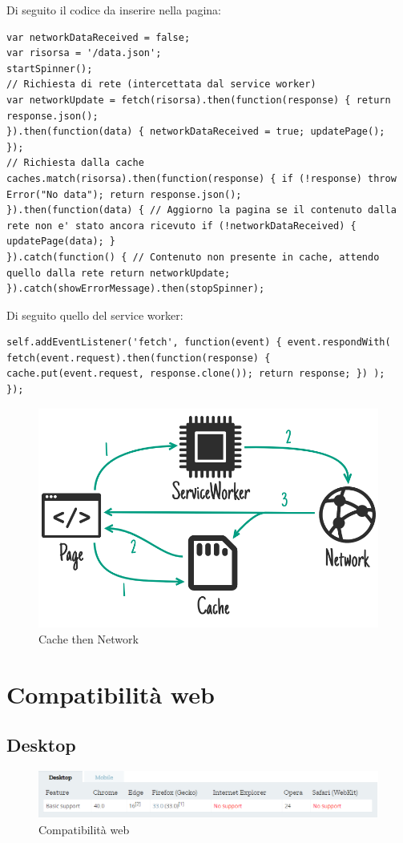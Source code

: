 \documentclass[italian]{article}
\begin{document}
Di seguito il codice da inserire nella pagina:
\begin{lstlisting}
var networkDataReceived = false;
var risorsa = '/data.json';
startSpinner();
// Richiesta di rete (intercettata dal service worker)
var networkUpdate = fetch(risorsa).then(function(response) { return response.json();
}).then(function(data) { networkDataReceived = true; updatePage();
});
// Richiesta dalla cache
caches.match(risorsa).then(function(response) { if (!response) throw Error("No data"); return response.json();
}).then(function(data) { // Aggiorno la pagina se il contenuto dalla rete non e' stato ancora ricevuto if (!networkDataReceived) { updatePage(data); }
}).catch(function() { // Contenuto non presente in cache, attendo quello dalla rete return networkUpdate;
}).catch(showErrorMessage).then(stopSpinner);
\end{lstlisting}
Di seguito quello del service worker:
\begin{lstlisting}
self.addEventListener('fetch', function(event) { event.respondWith( fetch(event.request).then(function(response) { cache.put(event.request, response.clone()); return response; }) );
});
\end{lstlisting}
\begin{figure}[h]
	\centering
	\includegraphics[width=1\linewidth]{Strategia6}
	\caption{Cache then Network}
	\label{fig: Cache then Network}
\end{figure}
\pagebreak

\section{Compatibilità web}
\subsection{Desktop}
\begin{figure}[h]
	\centering
	\includegraphics[width=1\linewidth]{CompWeb}
	\caption{Compatibilità web}
	\label{fig:Compatibilità web}
\end{figure}
\end{document}
